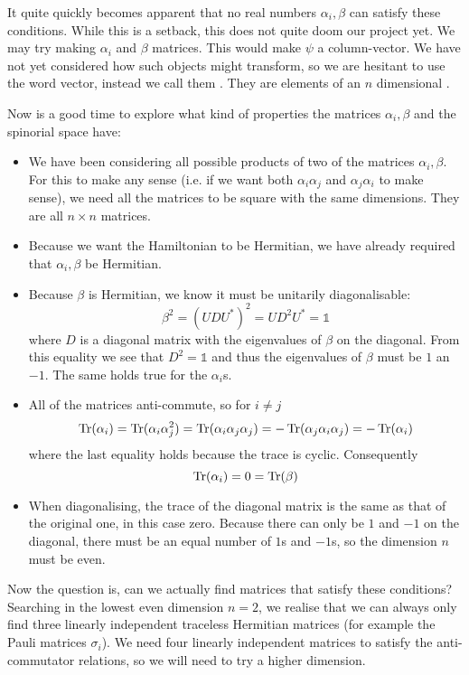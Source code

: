 It quite quickly becomes apparent that no real numbers $\alpha_i, \beta$ can satisfy these conditions. While this is a setback, this does not quite doom our project yet. We may try making $\alpha_i$ and $\beta$ matrices. This would make $\psi$ a column-vector. 
We have not yet considered how such objects might transform, so we are hesitant to use the word vector, instead we call them . They are elements of an $n$ dimensional .

Now is a good time to explore what kind of properties the matrices $\alpha_i, \beta$ and the spinorial space have:
\begin{itemize}
\item We have been considering all possible products of two of the matrices $\alpha_i, \beta$. For this to make any sense (i.e. if we want both $\alpha_i\alpha_j$ and $\alpha_j\alpha_i$ to make sense), we need all the matrices to be square with the same dimensions. They are all $n\times n$ matrices.
\item Because we want the Hamiltonian to be Hermitian, we have already required that $\alpha_i, \beta$ be Hermitian.
\item Because $\beta$ is Hermitian, we know it must be unitarily diagonalisable:
\[ \beta^2  = \left(UDU^*\right)^2 = UD^2U^* = \mathbb{1} \]
where $D$ is a diagonal matrix with the eigenvalues of $\beta$ on the diagonal. From this equality we see that $D^2 = \mathbb{1}$ and thus the eigenvalues of $\beta$ must be $1$ an $-1$. The same holds true for the $\alpha_i$s.
\item All of the matrices anti-commute, so for $i \neq j$ 
\[ \operatorname{Tr}(\alpha_i) = \operatorname{Tr}(\alpha_i\alpha_j^2) = \operatorname{Tr}(\alpha_i\alpha_j\alpha_j) = -\operatorname{Tr}(\alpha_j\alpha_i\alpha_j) =  - \operatorname{Tr}(\alpha_i) \]
where the last equality holds because the trace is cyclic. Consequently 
\[ \operatorname{Tr}(\alpha_i) = 0 = \operatorname{Tr}(\beta) \]
\item When diagonalising, the trace of the diagonal matrix is the same as that of the original one, in this case zero. Because there can only be $1$ and $-1$ on the diagonal, there must be an equal number of $1$s and $-1$s, so the dimension $n$ must be even.
\end{itemize}
Now the question is, can we actually find matrices that satisfy these conditions? Searching in the lowest even dimension $n = 2$, we realise that we can always only find three linearly independent traceless Hermitian matrices (for example the Pauli matrices $\sigma_i$). We need four linearly independent matrices to satisfy the anti-commutator relations, so we will need to try a higher dimension.

